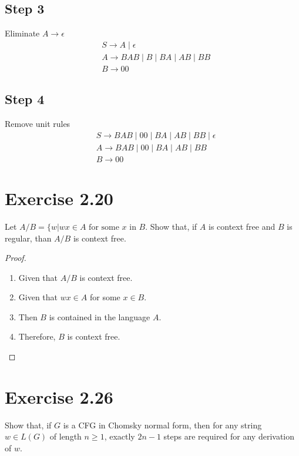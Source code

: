 \documentclass{article}
\begin{document}
\subsection*{Step 3}
  Eliminate $A \rightarrow \epsilon$
	\begin{align*}
		& S \rightarrow A \mid \epsilon\\
		& A \rightarrow BAB \mid B \mid BA \mid AB \mid BB\\
		& B \rightarrow 00 
	\end{align*}
\subsection*{Step 4}
  Remove unit rules
	\begin{align*}
		& S \rightarrow BAB \mid 00 \mid BA \mid AB \mid BB \mid \epsilon \\
		& A \rightarrow BAB \mid 00 \mid BA \mid AB \mid BB\\
		& B \rightarrow 00 
	\end{align*}

\section{Exercise 2.20}

Let $A/B = \{ w | wx \in A \text{ for some } x \text{ in } B$. Show that, if $A$
is context free and $B$ is regular, than $A/B$ is context free.

\begin{proof}
	\mbox{}
	\begin{enumerate}
		\item Given that $A/B$ is context free.
		\item Given that $wx \in A$ for some $x \in B$.
		\item Then $B$ is contained in the language $A$.
		\item Therefore, $B$ is context free. \qedhere
	\end{enumerate}
\end{proof}

\section{Exercise 2.26}

Show that, if $G$ is a CFG in Chomsky normal form, then for any string $w \in
L(G)$ of length $n \geq 1$, exactly $2n - 1$ steps are required for any
derivation of $w$.
\end{document}
